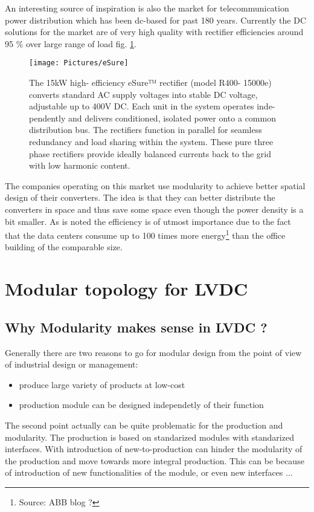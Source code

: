 \documentclass[]{scrartcl}
\begin{document}
An interesting source of inspiration is also the market for telecommunication power  distribution which has been dc-based for past 180 years. Currently the DC solutions for the market are of very high quality with rectifier efficiencies around 95 \% over large range of load fig. \ref{fig:eSure}.
\begin{figure}[h!]
	\centering
	\texttt{[image: Pictures/eSure]}
	\caption{The 15kW high- efficiency eSure™ rectifier (model R400- 15000e) converts standard AC supply voltages into stable DC voltage, adjustable up to 400V DC. Each unit in the system operates inde- pendently and delivers conditioned, isolated power onto a common distribution bus. The rectifiers function in parallel for seamless redundancy and load sharing within the system. These pure three phase rectifiers provide ideally balanced currents back to the grid with low harmonic content.}
	\label{fig:eSure}
\end{figure}
The companies operating on this market use modularity to achieve better spatial design of their converters. The idea is that they can better distribute the converters in space and thus save some space even though the power density is a bit smaller. As is noted the efficiency is of utmost importance due to the fact that the data centers consume up to 100 times more energy\footnote{Source: ABB blog ?} than the office building of the comparable size. 

\newpage
\newpage

\section{Modular topology for LVDC}


\subsection{Why Modularity makes sense in LVDC ?}

Generally there are two reasons to go for modular design from the point of view of industrial design or management\cite{Huang1998}:
\begin{itemize}
	\item produce large variety of products at low-cost
	\item production module can be designed independetly of their function
\end{itemize}

The second point actually can be quite problematic for the production and modularity. The production is based on standarized modules with standarized interfaces. With introduction of new-to-production \cite{JulianaHsuanMikkola2003} can hinder the modularity of the production and move towards more integral production. This can be because of introduction of new functionalities of the module, or even new interfaces ... 
\end{document}

